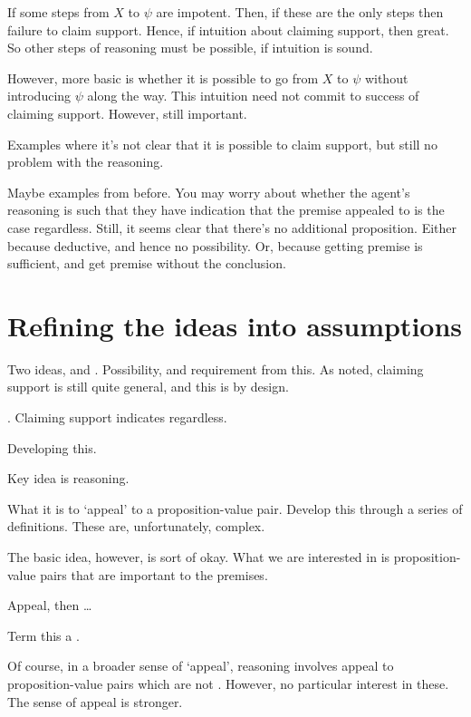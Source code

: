 \begin{note}
  If some steps from \(X\) to \(\psi\) are impotent.
  Then, if these are the only steps then failure to claim support.
  Hence, if intuition about claiming support, then great.
  So other steps of reasoning must be possible, if intuition is sound.

  However, more basic is whether it is possible to go from \(X\) to \(\psi\) without introducing \(\psi\) along the way.
  This intuition need not commit to success of claiming support.
  However, still important.

  Examples where it's not clear that it is possible to claim support, but still no problem with the reasoning.

  Maybe examples from before.
  You may worry about whether the agent's reasoning is such that they have indication that the premise appealed to is the case regardless.
  Still, it seems clear that there's no additional proposition.
  Either because deductive, and hence no possibility.
  Or, because getting premise is sufficient, and get premise without the conclusion.
\end{note}


\section{Refining the ideas into assumptions}
\label{sec:assumpt-from-ideas}

\begin{note}
  Two ideas, \ideaCSA{} and \ideaCSB{}.
  Possibility, and requirement from this.
  As noted, claiming support is still quite general, and this is by design.
\end{note}

\begin{note}
  \ideaCSB{}.
  Claiming support indicates regardless.

  Developing this.

  Key idea is reasoning.

  What it is to `appeal' to a proposition-value pair.
  Develop this through a series of definitions.
  These are, unfortunately, complex.

  The basic idea, however, is sort of okay.
  What we are interested in is proposition-value pairs that are important to the premises.

  \begin{idea}
    Appeal, then \dots
  \end{idea}

  Term this a \requ{}.

  Of course, in a broader sense of `appeal', reasoning involves appeal to proposition-value pairs which are not .
  However, no particular interest in these.
  The sense of appeal is stronger.
\end{note}

